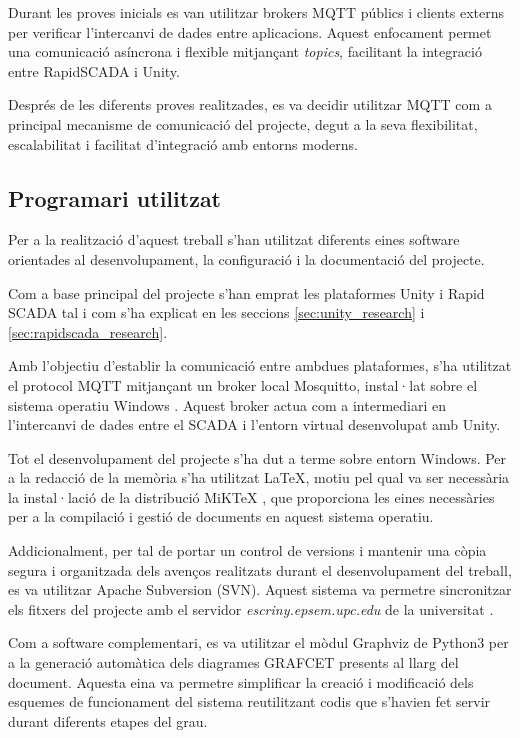 \documentclass[a4paper,11pt,DIV=13,headings=normal,abstract=true,twoside=semi]{article}
\begin{document}
Durant les proves inicials es van utilitzar brokers MQTT públics i clients externs per verificar l'intercanvi de dades entre aplicacions. Aquest enfocament permet una comunicació asíncrona i flexible mitjançant \textit{topics}, facilitant la integració entre RapidSCADA i Unity.

Després de les diferents proves realitzades, es va decidir utilitzar MQTT com a principal mecanisme de comunicació del projecte, degut a la seva flexibilitat, escalabilitat i facilitat d'integració amb entorns moderns.


\subsection{Programari utilitzat}

Per a la realització d'aquest treball s'han utilitzat diferents eines software orientades al desenvolupament, la configuració i la documentació del projecte.

Com a base principal del projecte s'han emprat les plataformes Unity i Rapid SCADA tal i com s'ha explicat en les seccions  \ref{sec:unity_research} i \ref{sec:rapidscada_research}.

Amb l'objectiu d'establir la comunicació entre ambdues plataformes, s'ha utilitzat el protocol MQTT mitjançant un broker local Mosquitto, instal·lat sobre el sistema operatiu Windows \cite{mosquitto_download}. Aquest broker actua com a intermediari en l'intercanvi de dades entre el SCADA i l'entorn virtual desenvolupat amb Unity.

Tot el desenvolupament del projecte s'ha dut a terme sobre entorn Windows. Per a la redacció de la memòria s'ha utilitzat \LaTeX{}, motiu pel qual va ser necessària la instal·lació de la distribució MiKTeX \cite{Latex}, que proporciona les eines necessàries per a la compilació i gestió de documents en aquest sistema operatiu.

Addicionalment, per tal de portar un control de versions i mantenir una còpia segura i organitzada dels avenços realitzats durant el desenvolupament del treball, es va utilitzar Apache Subversion (SVN). Aquest sistema va permetre sincronitzar els fitxers del projecte amb el servidor \textit{escriny.epsem.upc.edu} de la universitat \cite{Apache}.

Com a software complementari, es va utilitzar el mòdul Graphviz de Python3 per a la generació automàtica dels diagrames GRAFCET presents al llarg del document. Aquesta eina va permetre simplificar la creació i modificació dels esquemes de funcionament del sistema reutilitzant codis que s'havien fet servir durant diferents etapes del grau.
\end{document}
